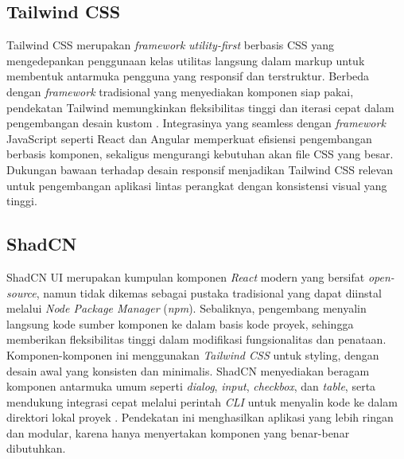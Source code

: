 \subsection{Tailwind CSS}

Tailwind CSS merupakan \emph{framework} \emph{utility-first} berbasis CSS yang mengedepankan penggunaan kelas utilitas langsung dalam markup untuk membentuk antarmuka pengguna yang responsif dan terstruktur. Berbeda dengan \emph{framework} tradisional yang menyediakan komponen siap pakai, pendekatan Tailwind memungkinkan fleksibilitas tinggi dan iterasi cepat dalam pengembangan desain kustom \cite{Azhariyah2024}. Integrasinya yang seamless dengan \emph{framework} JavaScript seperti React dan Angular memperkuat efisiensi pengembangan berbasis komponen, sekaligus mengurangi kebutuhan akan file CSS yang besar. Dukungan bawaan terhadap desain responsif menjadikan Tailwind CSS relevan untuk pengembangan aplikasi lintas perangkat dengan konsistensi visual yang tinggi.

\subsection{ShadCN}

ShadCN UI merupakan kumpulan komponen \emph{React} modern yang bersifat \emph{open-source}, namun tidak dikemas sebagai pustaka tradisional yang dapat diinstal melalui \emph{Node Package Manager} (\emph{npm}). Sebaliknya, pengembang menyalin langsung kode sumber komponen ke dalam basis kode proyek, sehingga memberikan fleksibilitas tinggi dalam modifikasi fungsionalitas dan penataan. Komponen-komponen ini menggunakan \emph{Tailwind CSS} untuk styling, dengan desain awal yang konsisten dan minimalis. ShadCN menyediakan beragam komponen antarmuka umum seperti \emph{dialog}, \emph{input}, \emph{checkbox}, dan \emph{table}, serta mendukung integrasi cepat melalui perintah \emph{CLI} untuk menyalin kode ke dalam direktori lokal proyek \cite{Shadcn2024}. Pendekatan ini menghasilkan aplikasi yang lebih ringan dan modular, karena hanya menyertakan komponen yang benar-benar dibutuhkan.


